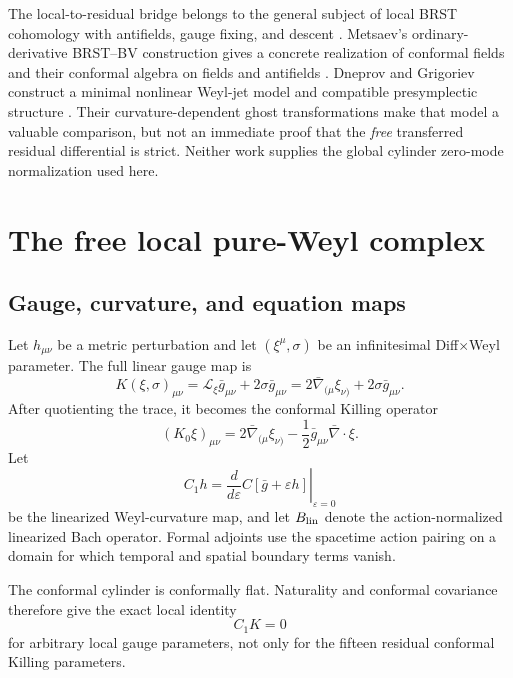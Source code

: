 \documentclass[11pt]{article}
\theoremstyle{definition}
\theoremstyle{remark}
\newcommand{\cL}{\mathcal L}
\begin{document}
The local-to-residual bridge belongs to the general subject of local BRST
cohomology with antifields, gauge fixing, and descent
\cite{BarnichBrandtHenneaux,BarnichHenneauxHurthSkenderis}.  Metsaev's
ordinary-derivative BRST--BV construction gives a concrete realization of
conformal fields and their conformal algebra on fields and antifields
\cite{MetsaevBRSTBV}.  Dneprov and Grigoriev construct a minimal nonlinear
Weyl-jet model and compatible presymplectic structure
\cite{DneprovGrigoriev}.  Their curvature-dependent ghost transformations
make that model a valuable comparison, but not an immediate proof that the
\emph{free} transferred residual differential is strict.  Neither work
supplies the global cylinder zero-mode normalization used here.

\section{The free local pure-Weyl complex}\label{sec:local-detour}

\subsection{Gauge, curvature, and equation maps}

Let $h_{\mu\nu}$ be a metric perturbation and let $(\xi^\mu,\sigma)$ be an
infinitesimal Diff$\times$Weyl parameter.  The full linear gauge map is
\begin{equation}\label{eq:full-K}
 K(\xi,\sigma)_{\mu\nu}
 =\cL_\xi\bar g_{\mu\nu}+2\sigma\bar g_{\mu\nu}
 =2\bar\nabla_{(\mu}\xi_{\nu)}+2\sigma\bar g_{\mu\nu}.
\end{equation}
After quotienting the trace, it becomes the conformal Killing operator
\begin{equation}\label{eq:K0}
 (K_0\xi)_{\mu\nu}
 =2\bar\nabla_{(\mu}\xi_{\nu)}
 -\frac12\bar g_{\mu\nu}\bar\nabla\!\cdot\!\xi.
\end{equation}
Let
\begin{equation}
 C_1h=\left.\frac{d}{d\varepsilon}
 C[\bar g+\varepsilon h]\right|_{\varepsilon=0}
\end{equation}
be the linearized Weyl-curvature map, and let $B_{\rm lin}$ denote the
action-normalized linearized Bach operator.  Formal adjoints use the
spacetime action pairing on a domain for which temporal and spatial boundary
terms vanish.

The conformal cylinder is conformally flat.  Naturality and conformal
covariance therefore give the exact local identity
\begin{equation}\label{eq:C1K}
 \boxed{C_1K=0}
\end{equation}
for arbitrary local gauge parameters, not only for the fifteen residual
conformal Killing parameters.
\end{document}
